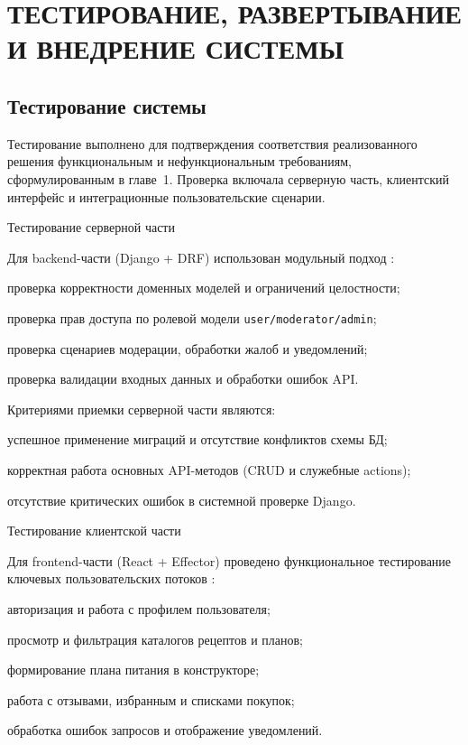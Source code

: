 \chapter{{\fontsize{14pt}{21pt}\selectfont\MakeUppercase{Тестирование, развертывание и внедрение системы}}}
\label{cha:testing}

\section{Тестирование системы}

Тестирование выполнено для подтверждения соответствия реализованного решения функциональным и нефункциональным требованиям, сформулированным в главе~1. Проверка включала серверную часть, клиентский интерфейс и интеграционные пользовательские сценарии.

Тестирование серверной части

Для backend-части (Django + DRF) использован модульный подход \cite{django_docs_2026,drf_docs_2026}:
\begin{compactlist}
  \item проверка корректности доменных моделей и ограничений целостности;
  \item проверка прав доступа по ролевой модели \texttt{user/moderator/admin};
  \item проверка сценариев модерации, обработки жалоб и уведомлений;
  \item проверка валидации входных данных и обработки ошибок API.
\end{compactlist}

Критериями приемки серверной части являются:
\begin{compactlist}
  \item успешное применение миграций и отсутствие конфликтов схемы БД;
  \item корректная работа основных API-методов (CRUD и служебные actions);
  \item отсутствие критических ошибок в системной проверке Django.
\end{compactlist}

Тестирование клиентской части

Для frontend-части (React + Effector) проведено функциональное тестирование ключевых пользовательских потоков \cite{react_docs_2026,effector_docs_2026}:
\begin{compactlist}
  \item авторизация и работа с профилем пользователя;
  \item просмотр и фильтрация каталогов рецептов и планов;
  \item формирование плана питания в конструкторе;
  \item работа с отзывами, избранным и списками покупок;
  \item обработка ошибок запросов и отображение уведомлений.
\end{compactlist}

